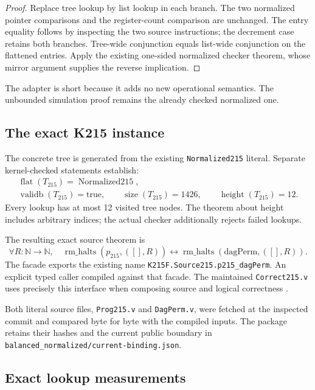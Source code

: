 \documentclass[11pt]{article}
\newcommand{\code}[1]{\texttt{#1}}
\theoremstyle{remark}
\begin{document}
\begin{proof}
Replace tree lookup by list lookup in each branch. The two normalized
pointer comparisons and the register-count comparison are unchanged.
The entry equality follows by inspecting the two source instructions;
the decrement case retains both branches. Tree-wide conjunction equals
list-wide conjunction on the flattened entries. Apply the existing
one-sided normalized checker theorem, whose mirror argument supplies the
reverse implication.
\end{proof}

The adapter is short because it adds no new operational semantics. The
unbounded simulation proof remains the already checked normalized one.

\subsection{The exact K215 instance}

The concrete tree is generated from the existing \code{Normalized215}
literal. Separate kernel-checked statements establish:
\[
\begin{gathered}
\operatorname{flat}(T_{215})=\operatorname{Normalized215},\\
\operatorname{validb}(T_{215})=\mathrm{true},\qquad
\operatorname{size}(T_{215})=1426,\qquad
\operatorname{height}(T_{215})=12.
\end{gathered}
\]
Every lookup has at most 12 visited tree nodes. The theorem about height
includes arbitrary indices; the actual checker additionally rejects failed
lookups.

The resulting exact source theorem is
\[
\forall R:\mathbb N\to\mathbb N,\quad
\operatorname{rm\_halts}(p_{215},([],R))
\longleftrightarrow
\operatorname{rm\_halts}(\mathrm{dagPerm},([],R)).
\]
The facade exports the existing name
\code{K215F.Source215.p215\_dagPerm}. An explicit typed caller compiled
against that facade. The maintained \code{Correct215.v} uses precisely
this interface when composing source and logical correctness
\cite{sourceendpoint}.

Both literal source files, \code{Prog215.v} and \code{DagPerm.v}, were fetched
at the inspected commit and compared byte for byte with the compiled inputs.
The package retains their hashes and the current public boundary in
\code{balanced\_normalized/current-binding.json}.

\subsection{Exact lookup measurements}
\end{document}
